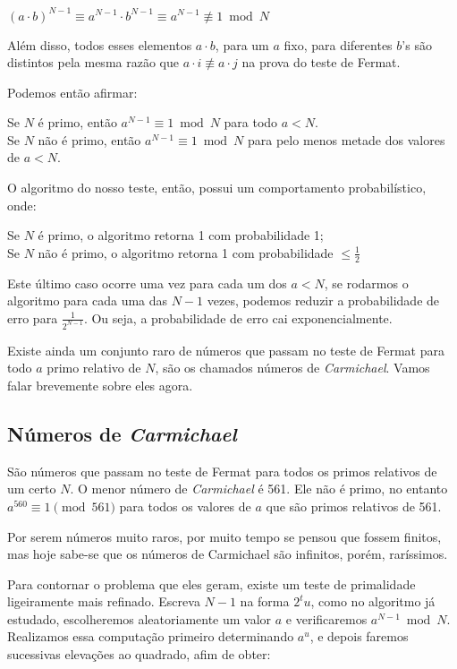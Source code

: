 $(a\cdot b)^{N-1}\equiv a^{N-1}\cdot b^{N-1}\equiv a^{N-1} \not\equiv 1 \bmod
N$

Além disso, todos esses elementos $a\cdot b$, para um $a$ fixo, para diferentes
$b$'s são distintos pela mesma razão que $a\cdot i \not\equiv a\cdot j$ na
prova do teste de Fermat.

Podemos então afirmar:

Se $N$ é primo, então $a^{N-1} \equiv 1 \bmod N$ para todo $a<N$.\\
Se $N$ não é primo, então $a^{N-1} \equiv 1 \bmod N$ para pelo menos metade
dos valores de $a<N$.

O algoritmo do nosso teste, então, possui um comportamento probabilístico,
onde:

Se $N$ é primo, o algoritmo retorna 1 com probabilidade 1;\\
Se $N$ não é primo, o algoritmo retorna 1 com probabilidade $\leq \frac{1}{2}$

Este último caso ocorre uma vez para cada um dos $a<N$, se rodarmos o
algoritmo para cada uma das $N-1$ vezes, podemos reduzir a probabilidade de
erro para $\frac{1}{2^{N-1}}$. Ou seja, a probabilidade de erro cai
exponencialmente.

Existe ainda um conjunto raro de números que passam no teste de Fermat para
todo $a$ primo relativo de $N$, são os chamados números de
\textit{Carmichael}. Vamos falar brevemente sobre eles agora.


\vspace{1.5em}
\subsection*{Números de \textit{Carmichael}}

São números que passam no teste de Fermat para todos os primos relativos de um
certo $N$. O menor número de \textit{Carmichael} é 561. Ele não é primo, no
entanto $a^{560} \equiv 1 \pmod 561$ para todos os valores de $a$ que são
primos relativos de 561.

Por serem números muito raros, por muito tempo se pensou que fossem finitos,
mas hoje sabe-se que os números de Carmichael são infinitos, porém,
raríssimos.

Para contornar o problema que eles geram, existe um teste de primalidade
ligeiramente mais refinado. Escreva $N-1$ na forma $2^tu$, como no algoritmo
já estudado, escolheremos aleatoriamente um valor $a$ e verificaremos $a^{N-1}
\bmod N$. Realizamos essa computação primeiro determinando $a^u$, e depois
faremos sucessivas elevações ao quadrado, afim de obter:

